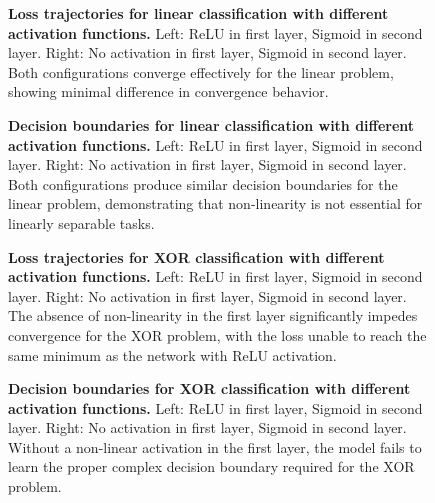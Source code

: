 \documentclass[twocolumn]{extarticle}
\begin{document}
\begin{figure}[H]
\caption{\textbf{Loss trajectories for linear classification with different activation functions.} Left: ReLU in first layer, Sigmoid in second layer. Right: No activation in first layer, Sigmoid in second layer. Both configurations converge effectively for the linear problem, showing minimal difference in convergence behavior.}
\label{fig:loss_linear_act}
\end{figure}

\begin{figure}[H]
\caption{\textbf{Decision boundaries for linear classification with different activation functions.} Left: ReLU in first layer, Sigmoid in second layer. Right: No activation in first layer, Sigmoid in second layer. Both configurations produce similar decision boundaries for the linear problem, demonstrating that non-linearity is not essential for linearly separable tasks.}
\label{fig:res_linear_act}
\end{figure}

\begin{figure}[H]
\caption{\textbf{Loss trajectories for XOR classification with different activation functions.} Left: ReLU in first layer, Sigmoid in second layer. Right: No activation in first layer, Sigmoid in second layer. The absence of non-linearity in the first layer significantly impedes convergence for the XOR problem, with the loss unable to reach the same minimum as the network with ReLU activation.}
\label{fig:loss_xor_act}
\end{figure}

\begin{figure}[H]
\caption{\textbf{Decision boundaries for XOR classification with different activation functions.} Left: ReLU in first layer, Sigmoid in second layer. Right: No activation in first layer, Sigmoid in second layer. Without a non-linear activation in the first layer, the model fails to learn the proper complex decision boundary required for the XOR problem.}
\label{fig:res_xor_act}
\end{figure}
\end{document}
